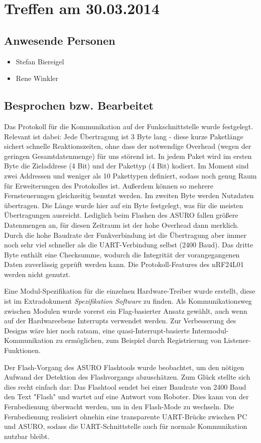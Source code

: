 \chapter{Treffen am 30.03.2014}
\section{Anwesende Personen}
\begin{itemize}
	\item Stefan Biereigel
	\item Rene Winkler
\end{itemize}

\section{Besprochen bzw. Bearbeitet}
Das Protokoll für die Kommunikation auf der Funkschnittstelle wurde festgelegt. Relevant ist dabei: Jede Übertragung ist 3 Byte lang - diese kurze Paketlänge sichert schnelle Reaktionszeiten, ohne dass der notwendige Overhead (wegen der geringen Gesamtdatenmenge) für uns störend ist. In jedem Paket wird im ersten Byte die Zieladdrese (4 Bit) und der Pakettyp (4 Bit) kodiert. Im Moment sind zwei Addressen und weniger als 10 Pakettypen definiert, sodass noch genug Raum für Erweiterungen des Protokolles ist. Außerdem können so mehrere Fernsteuerungen gleichzeitig benutzt werden. Im zweiten Byte werden Nutzdaten übertragen. Die Länge wurde hier auf ein Byte festgelegt, was für die meisten Übertragungen ausreicht. Lediglich beim Flashen des ASURO fallen größere Datenmengen an, für diesen Zeitraum ist der hohe Overhead dann merklich. Durch die hohe Baudrate der Funkverbindung ist die Übertragung aber immer noch sehr viel schneller als die UART-Verbindung selbst (2400 Baud). Das dritte Byte enthält eine Checksumme, wodurch die Integrität der vorangegangenen Daten zuverlässig geprüft werden kann. Die Protokoll-Features des nRF24L01 werden nicht genutzt.

Eine Modul-Spezifikation für die einzelnen Hardware-Treiber wurde erstellt, diese ist im Extradokument \textit{Spezifikation Software} zu finden. Als Kommunikationsweg zwischen Modulen wurde vorerst ein Flag-basierter Ansatz gewählt, auch wenn auf der Hardwareebene Interrupts verwendet werden. Zur Verbesserung des Designs wäre hier noch ratsam, eine quasi-Interrupt-basierte Intermodul-Kommunikation zu ermöglichen, zum Beispiel durch Registrierung von Listener-Funktionen. 

Der Flash-Vorgang des ASURO Flashtools wurde beobachtet, um den nötigen Aufwand der Detektion des Flashvorgangs abzuschätzen. Zum Glück stellte sich dies recht einfach dar: Das Flashtool sendet bei einer Baudrate von 2400 Baud den Text "Flash" und wartet auf eine Antwort vom Roboter. Dies kann von der Fernbedienung überwacht werden, um in den Flash-Mode zu wechseln. Die Fernbedienung realisiert ohnehin eine transparente UART-Brücke zwischen PC und ASURO, sodass die UART-Schnittstelle auch für normale Kommunikation nutzbar bleibt.

